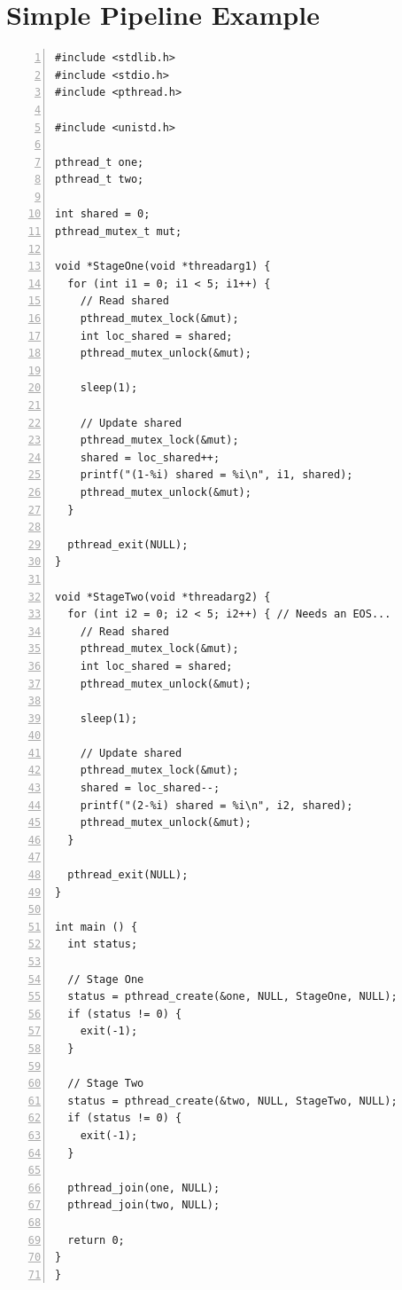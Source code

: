 \documentclass{llncs}
\begin{document}
\appendix
\section{Simple Pipeline Example}

\begin{lstlisting}[frame=single,numbers=left,label=lst:simplepipeexample,caption=Simple pipeline example.]
#include <stdlib.h>
#include <stdio.h>
#include <pthread.h>

#include <unistd.h>

pthread_t one;
pthread_t two;

int shared = 0;
pthread_mutex_t mut;

void *StageOne(void *threadarg1) {
  for (int i1 = 0; i1 < 5; i1++) {
    // Read shared
    pthread_mutex_lock(&mut);
    int loc_shared = shared;
    pthread_mutex_unlock(&mut);

    sleep(1);

    // Update shared
    pthread_mutex_lock(&mut);
    shared = loc_shared++;
    printf("(1-%i) shared = %i\n", i1, shared);
    pthread_mutex_unlock(&mut);
  }
  
  pthread_exit(NULL);
}

void *StageTwo(void *threadarg2) {
  for (int i2 = 0; i2 < 5; i2++) { // Needs an EOS...
    // Read shared
    pthread_mutex_lock(&mut);
    int loc_shared = shared;
    pthread_mutex_unlock(&mut);

    sleep(1);

    // Update shared
    pthread_mutex_lock(&mut);
    shared = loc_shared--;
    printf("(2-%i) shared = %i\n", i2, shared);
    pthread_mutex_unlock(&mut);
  }

  pthread_exit(NULL);
}

int main () {
  int status;

  // Stage One
  status = pthread_create(&one, NULL, StageOne, NULL);
  if (status != 0) {
    exit(-1);
  }

  // Stage Two
  status = pthread_create(&two, NULL, StageTwo, NULL);
  if (status != 0) {
    exit(-1);
  }

  pthread_join(one, NULL);
  pthread_join(two, NULL);

  return 0;
}
}
\end{lstlisting}








\end{document}
